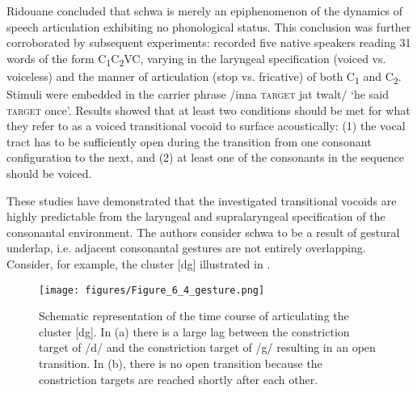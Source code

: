 Ridouane concluded that schwa is merely an epiphenomenon of the dynamics of speech articulation exhibiting no phonological status. This conclusion was further corroborated by subsequent experiments: \citet{RidouaneFougeron2011} recorded five native speakers reading 31 words of the form C\textsubscript{1}C\textsubscript{2}VC, varying in the laryngeal specification (voiced vs. voiceless) and the manner of articulation (stop vs. fricative) of both C\textsubscript{1} and C\textsubscript{2}. Stimuli were embedded in the carrier phrase /inna \textsc{target} jat twalt/ ‘he said \textsc{target} once’. Results showed that at least two conditions should be met for what they refer to as a voiced transitional vocoid to surface acoustically: (1) the vocal tract has to be sufficiently open during the transition from one consonant configuration to the next, and (2) at least one of the consonants in the sequence should be voiced.  

These studies have demonstrated that the investigated transitional vocoids are highly predictable from the laryngeal and supralaryngeal specification of the consonantal environment. The authors consider schwa to be a result of gestural underlap, i.e. adjacent consonantal gestures are not entirely overlapping. Consider, for example, the cluster [dg] illustrated in .  

  \begin{figure}
   \texttt{[image: figures/Figure\_6\_4\_gesture.png]}
  \caption{Schematic representation of the time course of articulating the cluster [dg]. In (a) there is a large lag between the constriction target of /d/ and the constriction target of /g/ resulting in an open transition. In (b), there is no open transition because the constriction targets are reached shortly after each other.}
   \label{fig:6.4}
   \end{figure}

